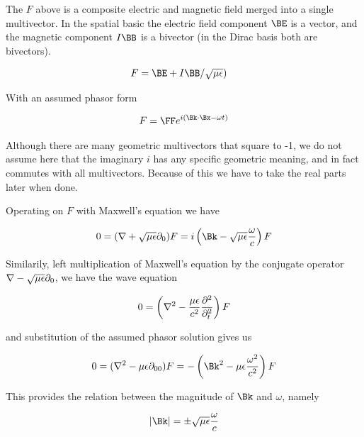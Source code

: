 The $F$ above is a composite electric and magnetic field merged into a single multivector.  In the spatial basic the electric field component $\BE$ is a vector, and the magnetic component $I\BB$ is a bivector (in the Dirac basis both are bivectors).

\begin{align}\label{eqn:foo1}
F &= \BE + I \BB/\sqrt{\mu\epsilon}) 
\end{align}

With an assumed phasor form

\begin{align}\label{eqn:foo2}
F = \FF e^{ i(\Bk \cdot \Bx - \omega t) } 
\end{align}

Although there are many geometric multivectors that square to -1, we do not assume here that the imaginary $i$ has any specific geometric meaning, and in fact commutes with all multivectors.  Because of this we have to take the real parts later when done.

Operating on $F$ with Maxwell's equation we have 

\begin{align}\label{eqn:foo3}
0 = (\grad + \sqrt{\mu\epsilon}\partial_0) F = i \left( \Bk - \sqrt{\mu\epsilon}\frac{\omega}{c} \right) F 
\end{align}

Similarily, left multiplication of Maxwell's equation by the conjugate operator $\nabla - \sqrt{\mu\epsilon}\partial_0$, we have the wave equation

\begin{align}\label{eqn:foo4}
0 &= \left(\nabla^2 - \frac{\mu\epsilon}{c^2}\frac{\partial^2}{\partial_t^2}\right) F \\
\end{align}

and substitution of the assumed phasor solution gives us

\begin{align}\label{eqn:foo7}
0 = (\grad^2 - {\mu\epsilon}\partial_{00}) F = -\left( \Bk^2 - {\mu\epsilon}\frac{\omega^2}{c^2} \right) F 
\end{align}

This provides the relation between the magnitude of $\Bk$ and $\omega$, namely

\begin{align}\label{eqn:foo8}
\Abs{\Bk} = \pm \sqrt{\mu\epsilon}\frac{\omega}{c} 
\end{align}

